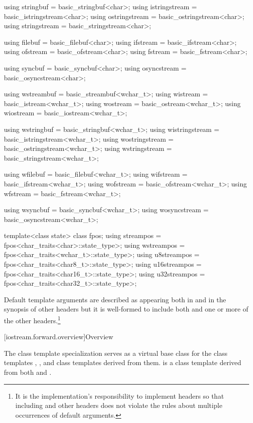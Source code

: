 \begin{codeblock}
{  using stringbuf     = basic_stringbuf<char>;
  using istringstream = basic_istringstream<char>;
  using ostringstream = basic_ostringstream<char>;
  using stringstream  = basic_stringstream<char>;

  using filebuf  = basic_filebuf<char>;
  using ifstream = basic_ifstream<char>;
  using ofstream = basic_ofstream<char>;
  using fstream  = basic_fstream<char>;

  using syncbuf = basic_syncbuf<char>;
  using osyncstream = basic_osyncstream<char>;

  using wstreambuf = basic_streambuf<wchar_t>;
  using wistream   = basic_istream<wchar_t>;
  using wostream   = basic_ostream<wchar_t>;
  using wiostream  = basic_iostream<wchar_t>;

  using wstringbuf     = basic_stringbuf<wchar_t>;
  using wistringstream = basic_istringstream<wchar_t>;
  using wostringstream = basic_ostringstream<wchar_t>;
  using wstringstream  = basic_stringstream<wchar_t>;

  using wfilebuf  = basic_filebuf<wchar_t>;
  using wifstream = basic_ifstream<wchar_t>;
  using wofstream = basic_ofstream<wchar_t>;
  using wfstream  = basic_fstream<wchar_t>;

  using wsyncbuf = basic_syncbuf<wchar_t>;
  using wosyncstream = basic_osyncstream<wchar_t>;

  template<class state> class fpos;
  using streampos  = fpos<char_traits<char>::state_type>;
  using wstreampos = fpos<char_traits<wchar_t>::state_type>;
  using u8streampos = fpos<char_traits<char8_t>::state_type>;
  using u16streampos = fpos<char_traits<char16_t>::state_type>;
  using u32streampos = fpos<char_traits<char32_t>::state_type>;
}
\end{codeblock}

\pnum
Default template arguments are described as appearing both in
and in the synopsis of other headers
but it is well-formed to include both
and one or more of the other headers.\footnote{It is the implementation's
responsibility to implement headers so
that including 
and other headers does not violate the rules about
multiple occurrences of default arguments.}

[iostream.forward.overview]{Overview}

\pnum
The
class template specialization
serves as a virtual base class for the
class templates
,
,
and
class templates
derived from them.
is a class
template
derived from both
and
.

